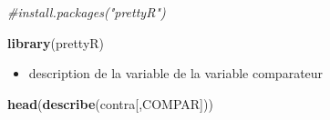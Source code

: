 \documentclass[
]{article}
\newenvironment{Shaded}{\begin{snugshade}}{\end{snugshade}}
\newcommand{\CommentTok}[1]{\textcolor[rgb]{0.56,0.35,0.01}{\textit{#1}}}
\newcommand{\KeywordTok}[1]{\textcolor[rgb]{0.13,0.29,0.53}{\textbf{#1}}}
\newcommand{\NormalTok}[1]{#1}
\providecommand{\tightlist}{%
  \setlength{\itemsep}{0pt}\setlength{\parskip}{0pt}}
\begin{document}
\begin{Shaded}
\begin{Highlighting}[]
\CommentTok{#install.packages("prettyR")}
\end{Highlighting}
\end{Shaded}

\begin{Shaded}
\begin{Highlighting}[]
\KeywordTok{library}\NormalTok{(prettyR)}
\end{Highlighting}
\end{Shaded}

\begin{itemize}
\tightlist
\item
  description de la variable de la variable comparateur
\end{itemize}

\begin{Shaded}
\begin{Highlighting}[]
\KeywordTok{head}\NormalTok{(}\KeywordTok{describe}\NormalTok{(contra[,COMPAR]))}
\end{Highlighting}
\end{Shaded}
\end{document}
